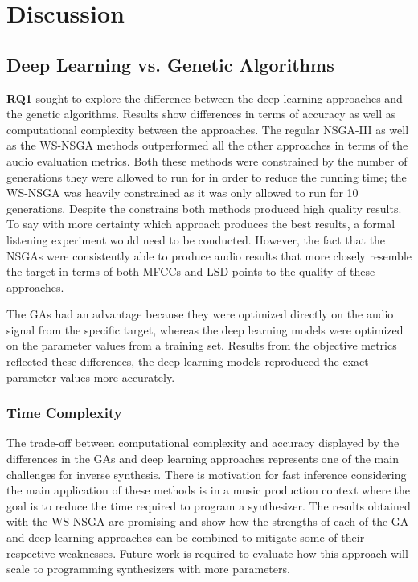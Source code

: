 \section{Discussion}
\label{sec:inverse-synth-discuss}

\subsection{Deep Learning vs. Genetic Algorithms}
\textbf{RQ1} sought to explore the difference between the deep learning approaches and the genetic algorithms. Results show differences in terms of accuracy as well as computational complexity between the approaches. The regular NSGA-III as well as the WS-NSGA methods outperformed all the other approaches in terms of the audio evaluation metrics. Both these methods were constrained by the number of generations they were allowed to run for in order to reduce the running time; the WS-NSGA was heavily constrained as it was only allowed to run for 10 generations. Despite the constrains both methods produced high quality results. To say with more certainty which approach produces the best results, a formal listening experiment would need to be conducted. However, the fact that the NSGAs were consistently able to produce audio results that more closely resemble the target in terms of both MFCCs and LSD points to the quality of these approaches. 

The GAs had an advantage because they were optimized directly on the audio signal from the specific target, whereas the deep learning models were optimized on the parameter values from a training set. Results from the objective metrics reflected these differences, the deep learning models reproduced the exact parameter values more accurately.

\subsubsection{Time Complexity}
The trade-off between computational complexity and accuracy displayed by the differences in the GAs and deep learning approaches represents one of the main challenges for inverse synthesis. There is motivation for fast inference considering the main application of these methods is in a music production context where the goal is to reduce the time required to program a synthesizer. The results obtained with the WS-NSGA are promising and show how the strengths of each of the GA and deep learning approaches can be combined to mitigate some of their respective weaknesses. Future work is required to evaluate how this approach will scale to programming synthesizers with more parameters.

